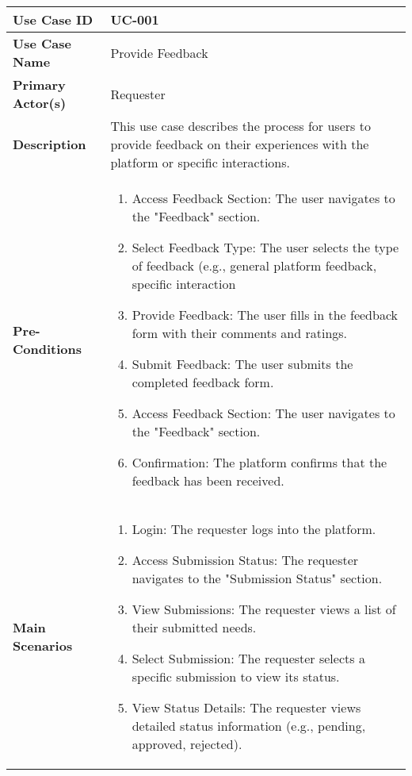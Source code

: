 \begin{table}[!ht]
    \centering
    \renewcommand{\arraystretch}{1.3} %
    \begin{tabularx}{\textwidth}{|l|X|}
        \hline
        \textbf{Use Case ID} & UC-001 \\
        \hline
        \textbf{Use Case Name} & Provide Feedback \\
        \hline
        \textbf{Primary Actor(s)} & Requester \\
        \hline
        \textbf{Description} &  This use case describes the process for users to provide feedback on their experiences with the platform or specific interactions.\\
        \hline
        \textbf{Pre-Conditions} & 
        \begin{enumerate}[label=\arabic*.,itemsep=0pt]
            \item Access Feedback Section: The user navigates to the "Feedback" section.
            \item Select Feedback Type: The user selects the type of feedback (e.g., general platform feedback, specific interaction 
            \item Provide Feedback: The user fills in the feedback form with their comments and ratings.
            \item Submit Feedback: The user submits the completed feedback form.
            \item Access Feedback Section: The user navigates to the "Feedback" section.
            \item Confirmation: The platform confirms that the feedback has been received.
        \end{enumerate} \\
        \hline
        \textbf{Main Scenarios} & 
        \begin{enumerate}[label=\arabic*.,itemsep=0pt]
            \item Login: The requester logs into the platform.
            \item Access Submission Status: The requester navigates to the "Submission Status" section.
            \item View Submissions: The requester views a list of their submitted needs.
            \item Select Submission: The requester selects a specific submission to view its status.
            \item View Status Details: The requester views detailed status information (e.g., pending, approved, rejected).
        \end{enumerate} \\
        

\end{tabularx}
\end{table}
